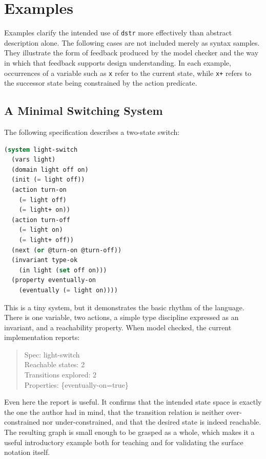 \documentclass[11pt]{article}
\begin{document}
\section{Examples}

Examples clarify the intended use of \texttt{dstr} more effectively than
abstract description alone. The following cases are not included merely as
syntax samples. They illustrate the form of feedback produced by the model
checker and the way in which that feedback supports design understanding. In
each example, occurrences of a variable such as \texttt{x} refer to the current
state, while \texttt{x+} refers to the successor state being constrained by the
action predicate.

\subsection{A Minimal Switching System}

The following specification describes a two-state switch:

\begin{lstlisting}[language=Lisp]
(system light-switch
  (vars light)
  (domain light off on)
  (init (= light off))
  (action turn-on
    (= light off)
    (= light+ on))
  (action turn-off
    (= light on)
    (= light+ off))
  (next (or @turn-on @turn-off))
  (invariant type-ok
    (in light (set off on)))
  (property eventually-on
    (eventually (= light on))))
\end{lstlisting}

This is a tiny system, but it demonstrates the basic rhythm of the language.
There is one variable, two actions, a simple type discipline expressed as an
invariant, and a reachability property. When model checked, the current
implementation reports:

\begin{quote}
Spec: light-switch\\
Reachable states: 2\\
Transitions explored: 2\\
Properties: \{eventually-on=true\}
\end{quote}

Even here the report is useful. It confirms that the intended state space is
exactly the one the author had in mind, that the transition relation is neither
over-constrained nor under-constrained, and that the desired state is indeed
reachable. The resulting graph is small enough to be grasped as a whole, which
makes it a useful introductory example both for teaching and for validating the
surface notation itself.
\end{document}
